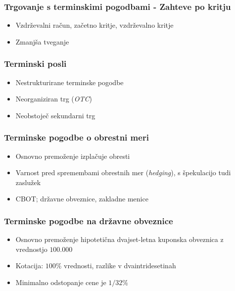 \documentclass[14pt]{beamer}
\begin{document}
\begin{frame}
    \frametitle{Trgovanje s terminskimi pogodbami - Zahteve po kritju}
    
    \begin{itemize}
        \item Vzdrževalni račun, začetno kritje, vzdrževalno kritje
        \item Zmanjša tveganje 
    \end{itemize}


\end{frame}


\begin{frame}
    \frametitle{Terminski posli}
    
    \begin{itemize}
        \item Nestrukturirane terminske pogodbe
        \item Neorganiziran trg (\textit{OTC})
        \item Neobstoječ sekundarni trg
    \end{itemize}


\end{frame}


\begin{frame}
    \frametitle{Terminske pogodbe o obrestni meri}
    
    \begin{itemize}
        \item Osnovno premoženje izplačuje obresti
        \item Varnost pred spremembami obrestnih mer (\textit{hedging}), s 
                špekulacijo tudi zaslužek
        \item CBOT; državne obveznice, zakladne menice
    \end{itemize}


\end{frame}


\begin{frame}
    \frametitle{Terminske pogodbe na državne obveznice}
    
    \begin{itemize}
        \item Osnovno premoženje hipotetična dvajset-letna kuponska 
                obveznica z vrednostjo $100.000$
        \item Kotacija: $100\%$ vrednosti, razlike v dvaintridesetinah
        \item Minimalno odstopanje cene je $1 / 32 \%$
    \end{itemize}


\end{frame}
\end{document}

